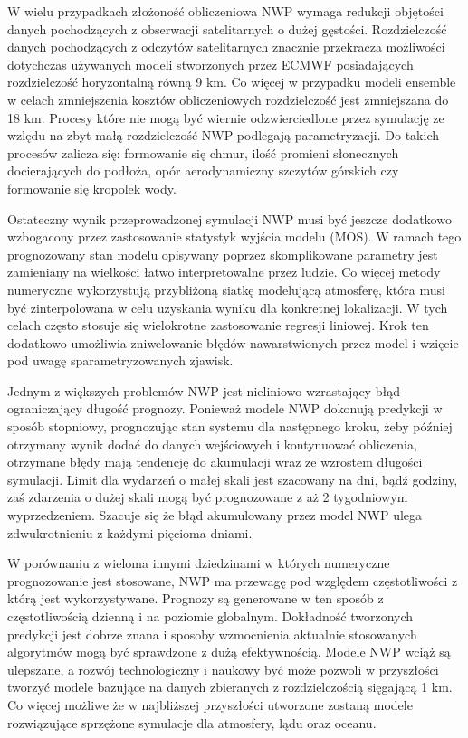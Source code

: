 W wielu przypadkach złożoność obliczeniowa NWP wymaga redukcji objętości danych pochodzących
z obserwacji satelitarnych o dużej gęstości. Rozdzielczość danych pochodzących z odczytów
satelitarnych znacznie przekracza możliwości dotychczas używanych modeli stworzonych przez
ECMWF posiadających rozdzielczość horyzontalną równą 9 km. Co więcej w przypadku modeli
ensemble w celach zmniejszenia kosztów obliczeniowych rozdzielczość jest zmniejszana do 18 km.
Procesy które nie mogą być wiernie odzwierciedlone przez symulację
ze wzlędu na zbyt małą rozdzielczość NWP podlegają parametryzacji.
Do takich procesów zalicza się: formowanie się chmur, ilość promieni słonecznych docierających do 
podłoża, opór aerodynamiczny szczytów górskich czy formowanie się kropolek wody.

Ostateczny wynik przeprowadzonej symulacji NWP musi być jeszcze dodatkowo wzbogacony przez zastosowanie
statystyk wyjścia modelu (MOS). W ramach tego prognozowany stan modelu opisywany poprzez skomplikowane
parametry jest zamieniany na wielkości łatwo interpretowalne przez ludzie. Co więcej metody numeryczne
wykorzystują przybliżoną siatkę modelującą atmosferę, która musi być zinterpolowana w celu uzyskania
wyniku dla konkretnej lokalizacji. W tych celach często stosuje się wielokrotne zastosowanie 
regresji liniowej. Krok ten dodatkowo umożliwia zniwelowanie błędów nawarstwionych przez model i wzięcie
pod uwagę sparametryzowanych zjawisk.

Jednym z większych problemów NWP jest nieliniowo wzrastający błąd ograniczający długość prognozy.
Ponieważ modele NWP dokonują predykcji w sposób stopniowy, prognozując stan systemu dla następnego
kroku, żeby później otrzymany wynik dodać do danych wejściowych i kontynuować obliczenia, otrzymane błędy
mają tendencję do akumulacji wraz ze wzrostem długości symulacji.
Limit dla wydarzeń o małej skali jest szacowany na dni, bądź godziny, zaś zdarzenia o dużej skali
mogą być prognozowane z aż 2 tygodniowym wyprzedzeniem. Szacuje się że błąd akumulowany przez 
model NWP ulega zdwukrotnieniu z każdymi pięcioma dniami.

W porównaniu z wieloma innymi dziedzinami w których numeryczne prognozowanie jest stosowane,
NWP ma przewagę pod względem częstotliwości z którą jest wykorzystywane. Prognozy są generowane
w ten sposób z częstotliwością dzienną i na poziomie globalnym. Dokładność tworzonych predykcji jest
dobrze znana i sposoby wzmocnienia aktualnie stosowanych algorytmów mogą być sprawdzone z dużą
efektywnością. Modele NWP wciąż są ulepszane, a rozwój technologiczny i naukowy być może pozwoli
w przyszłości tworzyć modele bazujące na danych zbieranych z rozdzielczością sięgającą 1 km. Co więcej
możliwe że w najbliższej przyszłości utworzone zostaną modele rozwiązujące sprzężone symulacje
dla atmosfery, lądu oraz oceanu\cite{nwp-the-quiet-revolution}.

